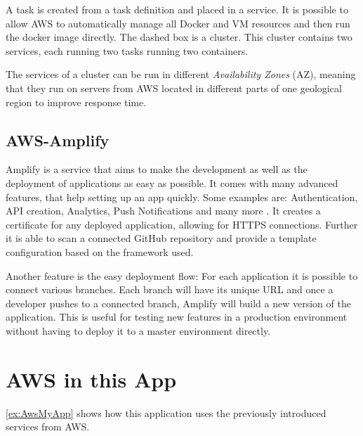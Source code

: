A task is created from a task definition and placed in a service. It is possible to allow AWS to automatically manage all Docker and VM resources and then run the docker image directly. The dashed box is a cluster. This cluster contains two services, each running two tasks running two containers. 

The services of a cluster can be run in different \emph{Availability Zones} (AZ), meaning that they run on servers from AWS located in different parts of one geological region to improve response time.

\subsection{AWS-Amplify}
Amplify is a service that aims to make the development as well as the deployment of applications as easy as possible. It comes with many advanced features, that help setting up an app quickly. Some examples are: Authentication, API creation, Analytics, Push Notifications and many more \cite{AwsAmplify}. It creates a certificate for any deployed application, allowing for HTTPS connections. Further it is able to scan a connected GitHub repository and provide a template configuration based on the framework used.

Another feature is the easy deployment flow: For each application it is possible to connect various branches. Each branch will have its unique URL and once a developer pushes to a connected branch, Amplify will build a new version of the application. This is useful for testing new features in a production environment without having to deploy it to a master environment directly.

\section{AWS in this App}
\autoref{ex:AwsMyApp} shows how this application uses the previously introduced services from AWS.

